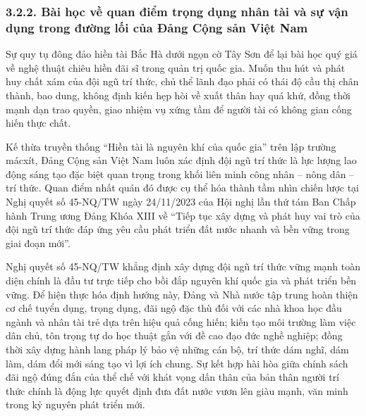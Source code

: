 \subsubsection*{3.2.2. Bài học về quan điểm trọng dụng nhân tài và sự vận dụng trong đường lối của Đảng Cộng sản Việt Nam}

Sự quy tụ đông đảo hiền tài Bắc Hà dưới ngọn cờ Tây Sơn để lại bài học quý giá về nghệ thuật chiêu hiền đãi sĩ trong quản trị quốc gia. Muốn thu hút và phát huy chất xám của đội ngũ trí thức, chủ thể lãnh đạo phải có thái độ cầu thị chân thành, bao dung, không định kiến hẹp hòi về xuất thân hay quá khứ, đồng thời mạnh dạn trao quyền, giao nhiệm vụ xứng tầm để người tài có không gian cống hiến thực chất.

Kế thừa truyền thống ``Hiền tài là nguyên khí của quốc gia'' trên lập trường mácxít, Đảng Cộng sản Việt Nam luôn xác định đội ngũ trí thức là lực lượng lao động sáng tạo đặc biệt quan trọng trong khối liên minh công nhân -- nông dân -- trí thức. Quan điểm nhất quán đó được cụ thể hóa thành tầm nhìn chiến lược tại Nghị quyết số 45-NQ/TW ngày 24/11/2023 của Hội nghị lần thứ tám Ban Chấp hành Trung ương Đảng Khóa XIII về ``Tiếp tục xây dựng và phát huy vai trò của đội ngũ trí thức đáp ứng yêu cầu phát triển đất nước nhanh và bền vững trong giai đoạn mới''.

Nghị quyết số 45-NQ/TW khẳng định xây dựng đội ngũ trí thức vững mạnh toàn diện chính là đầu tư trực tiếp cho bồi đắp nguyên khí quốc gia và phát triển bền vững. Để hiện thực hóa định hướng này, Đảng và Nhà nước tập trung hoàn thiện cơ chế tuyển dụng, trọng dụng, đãi ngộ đặc thù đối với các nhà khoa học đầu ngành và nhân tài trẻ dựa trên hiệu quả cống hiến; kiến tạo môi trường làm việc dân chủ, tôn trọng tự do học thuật gắn với đề cao đạo đức nghề nghiệp; đồng thời xây dựng hành lang pháp lý bảo vệ những cán bộ, trí thức dám nghĩ, dám làm, dám đổi mới sáng tạo vì lợi ích chung. Sự kết hợp hài hòa giữa chính sách đãi ngộ đúng đắn của thể chế với khát vọng dấn thân của bản thân người trí thức chính là động lực quyết định đưa đất nước vươn lên giàu mạnh, văn minh trong kỷ nguyên phát triển mới.
